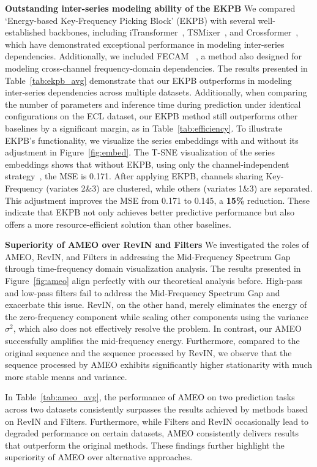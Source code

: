 \textbf{Outstanding inter-series modeling ability of the EKPB \quad} We compared `Energy-based Key-Frequency Picking Block' (EKPB) with several well-established backbones, including iTransformer~\citep{LiuiTransformer}, TSMixer~\citep{chen2023tsmixer}, and Crossformer~\citep{zhang2023crossformer}, which have demonstrated exceptional performance in modeling inter-series dependencies. Additionally, we included FECAM
~\citep{jiang2023fecam}, a method also designed for modeling cross-channel frequency-domain dependencies. The results presented in Table~\ref{tab:ekpb_avg} demonstrate that our EKPB outperforms in modeling inter-series dependencies across multiple datasets. Additionally, when comparing the number of parameters and inference time during prediction under identical configurations on the ECL dataset, our EKPB method still outperforms other baselines by a significant margin, as in Table~\ref{tab:efficiency}. To illustrate EKPB's functionality, we visualize the series embeddings with and without its adjustment in Figure~\ref{fig:embed}. The T-SNE visualization of the series embeddings shows that without EKPB, using only the channel-independent strategy~\citep{Nie2022patchtst}, the MSE is 0.171. After applying EKPB, channels sharing Key-Frequency (variates 2\&3) are clustered, while others (variates 1\&3) are separated. This adjustment improves the MSE from 0.171 to 0.145, a \textbf{15\%} reduction. These indicate that EKPB not only achieves better predictive performance but also offers a more resource-efficient solution than other baselines.

\textbf{Superiority of AMEO over RevIN and Filters \quad} We investigated the roles of AMEO, RevIN, and Filters in addressing the Mid-Frequency Spectrum Gap through time-frequency domain visualization analysis. The results presented in Figure~\ref{fig:ameo} align perfectly with our theoretical analysis before. High-pass and low-pass filters fail to address the Mid-Frequency Spectrum Gap and exacerbate this issue. RevIN, on the other hand, merely eliminates the energy of the zero-frequency component while scaling other components using the variance \( \sigma^2 \), which also does not effectively resolve the problem. In contrast, our AMEO successfully amplifies the mid-frequency energy. Furthermore, compared to the original sequence and the sequence processed by RevIN, we observe that the sequence processed by AMEO exhibits significantly higher stationarity with much more stable means and variance.

In Table~\ref{tab:ameo_avg}, the performance of AMEO on two prediction tasks across two datasets consistently surpasses the results achieved by methods based on RevIN and Filters. Furthermore, while Filters and RevIN occasionally lead to degraded performance on certain datasets, AMEO consistently delivers results that outperform the original methods. These findings further highlight the superiority of AMEO over alternative approaches.